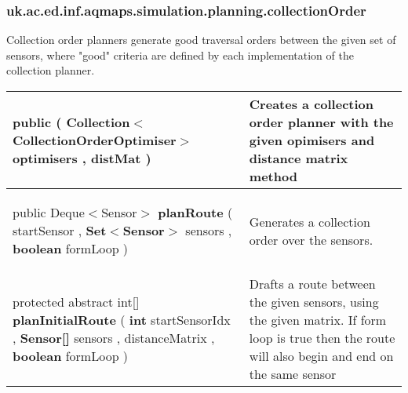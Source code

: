 \subsubsection*{ uk.ac.ed.inf.aqmaps.simulation.planning.collectionOrder }
 {\scriptsize Collection order planners generate good traversal orders between the given set of sensors,\newline%
 where "good" criteria are defined by each implementation of the collection planner.
 
\vspace*{-5pt} 
\begin{tabularx}{\linewidth}{m{}|m{}}
\label{tab:BaseCollectionOrderPlanner}
\begin{raggedleft}public  \textbf{\hyperref[tab:BaseCollectionOrderPlanner]{\color{blue}{BaseCollectionOrderPlanner}} }(\newline \hfill 
\hspace*{ 5pt} \textbf{Collection$<$CollectionOrderOptimiser$>$} optimisers , \newline
 \hspace*{ 5pt} \textbf{\hyperref[tab:DistanceMatrix]{\color{blue}{DistanceMatrix}}} distMat  )
\end{raggedleft} &
 Creates a collection order planner with the given opimisers and distance matrix method\\ \hline 
\begin{raggedleft}public Deque$<$Sensor$>$ \textbf{planRoute }(\newline \hfill 
\hspace*{ 5pt} \textbf{\hyperref[tab:Sensor]{\color{blue}{Sensor}}} startSensor , \newline
 \hspace*{ 5pt} \textbf{Set$<$Sensor$>$} sensors , \newline
 \hspace*{ 5pt} \textbf{boolean} formLoop  )
\end{raggedleft} &
 Generates a collection order over the sensors.\\ \hline 
\begin{raggedleft}protected abstract int{[}{]} \textbf{planInitialRoute }(\newline \hfill 
\hspace*{ 5pt} \textbf{int} startSensorIdx , \newline
 \hspace*{ 5pt} \textbf{Sensor{[}{]}} sensors , \newline
 \hspace*{ 5pt} \textbf{\hyperref[tab:DistanceMatrix]{\color{blue}{DistanceMatrix}}} distanceMatrix , \newline
 \hspace*{ 5pt} \textbf{boolean} formLoop  )
\end{raggedleft} &
 Drafts a route between the given sensors, using the given matrix. If form loop is true then the route will also begin and end on the same sensor\\\end{tabularx}
}
